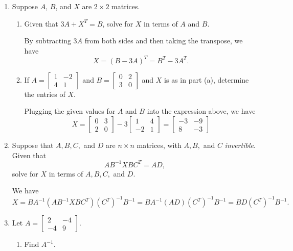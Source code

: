 \documentclass[12pt]{article}
\newcommand{\points}[1]{\marginpar{\hspace{24pt}[#1]}}
\begin{document}
\begin{enumerate}
\bigskip

\newpage

\item Suppose $A$, $B$, and $X$ are $2\times 2$ matrices.
\begin{enumerate}
\item Given that $3A+X^T=B$, solve for $X$ in terms of $A$ and $B$.\points{3}


\bigskip

 By subtracting $3A$ from both sides and then taking the transpose, we have
\[
 X = (B-3A)^T = B^T-3A^T.
\]


\bigskip


\item If $A=\begin{bmatrix}1&-2\\4&1\end{bmatrix}$ and $B=\begin{bmatrix}0&2\\3&0\end{bmatrix}$ and $X$ is as in part (a), determine the entries of $X$. \points{3}


\bigskip

 Plugging the given values for $A$ and $B$ into the expression above, we have
\[
 X = \begin{bmatrix}0&3\\2&0\end{bmatrix}-3\begin{bmatrix}1&4\\-2&1\end{bmatrix} = \begin{bmatrix}-3&-9\\8&-3\end{bmatrix}
\]


\bigskip


\end{enumerate}
\item Suppose that $A,B,C,$ and $D$ are $n\times n$ matrices, with $A,B,$ and $C$ {\em invertible}. Given that \points{4}
\[
AB^{-1}XBC^T = AD,
\]
solve for $X$ in terms of $A,B,C,$ and $D$.


\bigskip

 We have
\[
 X = BA^{-1}(AB^{-1}XBC^T)(C^T)^{-1}B^{-1} = BA^{-1}(AD)(C^T)^{-1}B^{-1} = BD(C^T)^{-1}B^{-1}.
\]


\bigskip

\newpage

\item Let $A=\begin{bmatrix}2&-4\\-4&9\end{bmatrix}$.
\begin{enumerate}
\item Find $A^{-1}$. \points{5}



\end{enumerate}
\end{enumerate}
\end{document}
